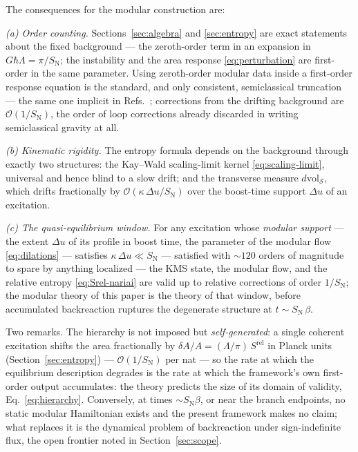 \documentclass[11pt]{article}
\newcommand{\Srel}{S^{\mathrm{rel}}}
\begin{document}
The consequences for the modular construction are:

\emph{(a) Order counting.} Sections~\ref{sec:algebra} and \ref{sec:entropy} are exact statements about the fixed background --- the zeroth-order term in an expansion in $G\hbar\Lambda = \pi/S_{\mathrm{N}}$; the instability and the area response \eqref{eq:perturbation} are first-order in the same parameter. Using zeroth-order modular data inside a first-order response equation is the standard, and only consistent, semiclassical truncation --- the same one implicit in Refs.~\cite{Jacobson,DorauMuch}; corrections from the drifting background are $\mathcal{O}(1/S_{\mathrm{N}})$, the order of loop corrections already discarded in writing semiclassical gravity at all.

\emph{(b) Kinematic rigidity.} The entropy formula depends on the background through exactly two structures: the Kay--Wald scaling-limit kernel \eqref{eq:scaling-limit}, universal and hence blind to a slow drift; and the transverse measure $d\mathrm{vol}_{\mathcal{S}}$, which drifts fractionally by $\mathcal{O}(\kappa\,\Delta u / S_{\mathrm{N}})$ over the boost-time support $\Delta u$ of an excitation.

\emph{(c) The quasi-equilibrium window.} For any excitation whose \emph{modular support} --- the extent $\Delta u$ of its profile in boost time, the parameter of the modular flow \eqref{eq:dilations} --- satisfies $\kappa\,\Delta u \ll S_{\mathrm{N}}$ --- satisfied with $\sim 120$ orders of magnitude to spare by anything localized --- the KMS state, the modular flow, and the relative entropy \eqref{eq:Srel-nariai} are valid up to relative corrections of order $1/S_{\mathrm{N}}$; the modular theory of this paper is the theory of that window, before accumulated backreaction ruptures the degenerate structure at $t \sim S_{\mathrm{N}}\,\beta$.

Two remarks. The hierarchy is not imposed but \emph{self-generated}: a single coherent excitation shifts the area fractionally by $\delta A/A = (\Lambda/\pi)\,\Srel$ in Planck units (Section~\ref{sec:entropy}) --- $\mathcal{O}(1/S_{\mathrm{N}})$ per nat --- so the rate at which the equilibrium description degrades is the rate at which the framework's own first-order output accumulates: the theory predicts the size of its domain of validity, Eq.~\eqref{eq:hierarchy}. Conversely, at times $\sim S_{\mathrm{N}}\beta$, or near the branch endpoints, no static modular Hamiltonian exists and the present framework makes no claim; what replaces it is the dynamical problem of backreaction under sign-indefinite flux, the open frontier noted in Section~\ref{sec:scope}.
\end{document}

